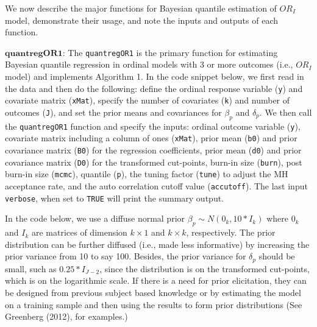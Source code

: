 We now describe the major functions for Bayesian quantile estimation of \(OR_{I}\) model, demonstrate their usage, and note the inputs and outputs of each function.

\(\textbf{quantregOR1}\): The \texttt{quantregOR1} is the primary function for estimating Bayesian quantile regression in ordinal models with 3 or more outcomes (i.e., \(OR_{I}\) model) and implements Algorithm 1. In the code snippet below, we first read in the data and then do the following: define the ordinal response variable (\texttt{y}) and covariate matrix (\texttt{xMat}), specify the number of covariates (\texttt{k}) and number of outcomes (\texttt{J}), and set the prior means and covariances for \(\beta_{p}\) and \(\delta_{p}\). We then call the \texttt{quantregOR1} function and specify the inputs: ordinal outcome variable (\texttt{y}), covariate matrix including a column of ones (\texttt{xMat}), prior mean (\texttt{b0}) and prior covariance matrix (\texttt{B0}) for the regression coefficients, prior mean (\texttt{d0}) and prior covariance matrix (\texttt{D0}) for the transformed cut-points, burn-in size (\texttt{burn}), post burn-in size (\texttt{mcmc}), quantile (\texttt{p}), the tuning factor (\texttt{tune}) to adjust the MH acceptance rate, and the auto correlation cutoff value (\texttt{accutoff}). The last input \texttt{verbose}, when set to \texttt{TRUE} will print the summary output.

In the code below, we use a diffuse normal prior \(\beta_{p} \sim N(0_{k}, 10\ast I_{k})\) where \(0_{k}\) and \(I_{k}\) are matrices of dimension \(k \times 1\) and \(k \times k\), respectively. The prior distribution can be further diffused (i.e., made less informative) by increasing the prior variance from 10 to say 100. Besides, the prior variance for \(\delta_{p}\) should be small, such as \(0.25 \ast I_{J-2}\), since the distribution is on the transformed cut-points, which is on the logarithmic scale. If there is a need for prior elicitation, they can be designed from previous subject based knowledge or by estimating the model on a training sample and then using the results to form prior distributions (See Greenberg (2012), for examples.)


